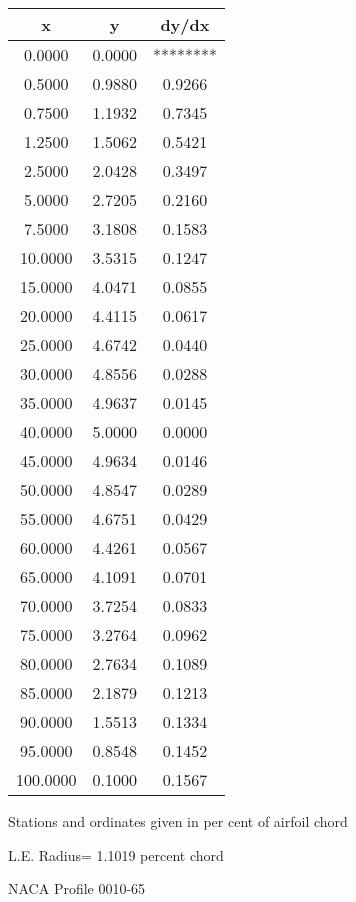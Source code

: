 \documentclass[11pt]{book}
\begin{document}
 \vspace{8mm}
 \begin{tabular}{|c|c|c|} \hline 
  x  &  y  &  dy/dx \\
 \hline
0.0000 & 0.0000 & ******** \\
0.5000 & 0.9880 & 0.9266 \\
0.7500 & 1.1932 & 0.7345 \\
1.2500 & 1.5062 & 0.5421 \\
2.5000 & 2.0428 & 0.3497 \\
5.0000 & 2.7205 & 0.2160 \\
7.5000 & 3.1808 & 0.1583 \\
10.0000 & 3.5315 & 0.1247 \\
15.0000 & 4.0471 & 0.0855 \\
20.0000 & 4.4115 & 0.0617 \\
25.0000 & 4.6742 & 0.0440 \\
30.0000 & 4.8556 & 0.0288 \\
35.0000 & 4.9637 & 0.0145 \\
40.0000 & 5.0000 & 0.0000 \\
45.0000 & 4.9634 & 0.0146 \\
50.0000 & 4.8547 & 0.0289 \\
55.0000 & 4.6751 & 0.0429 \\
60.0000 & 4.4261 & 0.0567 \\
65.0000 & 4.1091 & 0.0701 \\
70.0000 & 3.7254 & 0.0833 \\
75.0000 & 3.2764 & 0.0962 \\
80.0000 & 2.7634 & 0.1089 \\
85.0000 & 2.1879 & 0.1213 \\
90.0000 & 1.5513 & 0.1334 \\
95.0000 & 0.8548 & 0.1452 \\
100.0000 & 0.1000 & 0.1567 \\
 \hline
 \end{tabular}
 \vspace{8mm}


Stations and ordinates given in per cent of airfoil chord 


L.E. Radius=  1.1019 percent chord
 \newpage
  \label{p0010-65}
 \begin{Large}
 NACA Profile 0010-65
 \end{Large}
  
\end{document}
